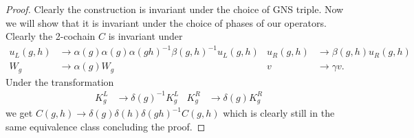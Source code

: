\documentclass[12pt,a4paper,twoside]{article}
\theoremstyle{definition}
\numberwithin{equation}{section}
\begin{document}
\begin{proof}
	Clearly the construction is invariant under the choice of GNS triple. Now we will show that it is invariant under the choice of phases of our operators. Clearly the 2-cochain $C$ is invariant under
	\begin{align}
		u_L(g,h)&\rightarrow \alpha(g)\alpha(g)\alpha(gh)^{-1}\beta(g,h)^{-1} u_L(g,h)&u_R(g,h)&\rightarrow \beta(g,h)u_R(g,h)\\
		W_g&\rightarrow\alpha(g)W_g&v&\rightarrow \gamma v.
	\end{align}
	Under the transformation
	\begin{align}
		K_g^L&\rightarrow \delta(g)^{-1}K_g^L&K_g^R&\rightarrow \delta(g)K_g^R
	\end{align}
	we get $C(g,h)\rightarrow \delta(g)\delta(h)\delta(gh)^{-1}C(g,h)$ which is clearly still in the same equivalence class concluding the proof.
\end{proof}
\end{document}
